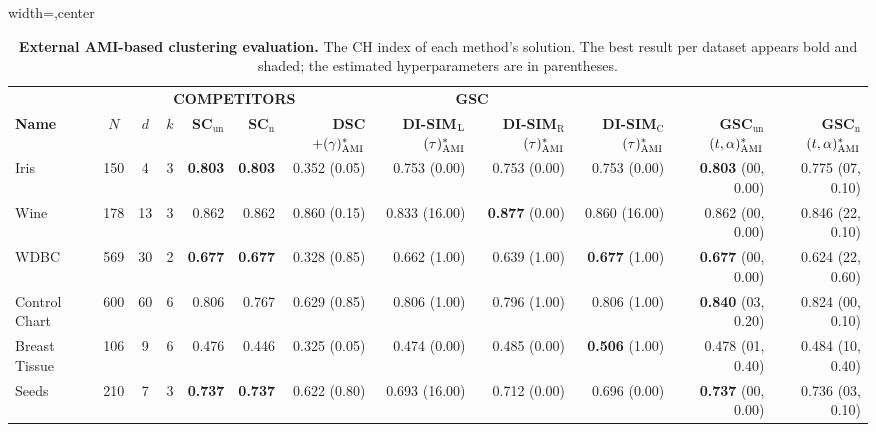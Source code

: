 \documentclass[10pt]{article} %
\newcommand{\bestcell}[1]{\cellcolor{gray!30}\textbf{#1}}
\newcommand{\GSC}{GSC\xspace}
\newcommand{\bestpar}[2] {(#1)^*_{\textsc{#2}}}
\newcommand{\hyperp}[1]{\tiny{\tiny(#1)}}
\begin{document}
\begin{table}[t]
\scriptsize
\centering
%
\caption{\textbf{External AMI-based clustering evaluation.} The CH index of each method's solution. The best result per dataset appears bold and shaded; the estimated hyperparameters are in parentheses.}
\vskip -5pt
\label{tab:ami_clustering_scores}
\begin{adjustbox}{width=\linewidth,center}
\begin{tabular}{lccc|rrrrrr|rr}
\Xhline{1pt}
\multicolumn{4}{c|}{\fontsize{6pt}{6pt}\textbf{DATASETS}} & \multicolumn{6}{c|}{\fontsize{6pt}{6pt}\textbf{COMPETITORS}} & \multicolumn{2}{c}{\fontsize{6pt}{6pt}\textbf{\GSC}}\\[0.25em]
\textbf{Name} & $N$ & $d$ & $k$
& \textbf{SC$_{\text{un}}$} & \textbf{SC$_{\text{n}}$} & \textbf{DSC}$+\bestpar{\gamma}{AMI}$
& \textbf{DI-SIM$_{\textup{L}}$}$\bestpar{\tau}{AMI}$ & \textbf{DI-SIM$_{\text{R}}$}$\bestpar{\tau}{AMI}$ & \textbf{DI-SIM$_{\text{C}}$}$\bestpar{\tau}{AMI}$
& \textbf{GSC$_{\text{un}}$}$\bestpar{t,\alpha}{AMI}$ & \textbf{GSC$_{\text{n}}$}$\bestpar{t,\alpha}{AMI}$ \\[0.25em]
\hline
Iris & 150 & 4 & 3 & \bestcell{0.803} & \bestcell{0.803} & 0.352 \hyperp{0.05} & 0.753 \hyperp{0.00} & 0.753 \hyperp{0.00} & 0.753 \hyperp{0.00} & \bestcell{0.803} \hyperp{00, 0.00} & 0.775 \hyperp{07, 0.10} \\
Wine & 178 & 13 & 3 & 0.862 & 0.862 & 0.860 \hyperp{0.15} & 0.833 \hyperp{16.00} & \bestcell{0.877} \hyperp{0.00} & 0.860 \hyperp{16.00} & 0.862 \hyperp{00, 0.00} & 0.846 \hyperp{22, 0.10} \\
WDBC & 569 & 30 & 2 & \bestcell{0.677} & \bestcell{0.677} & 0.328 \hyperp{0.85} & 0.662 \hyperp{1.00} & 0.639 \hyperp{1.00} & \bestcell{0.677} \hyperp{1.00} & \bestcell{0.677} \hyperp{00, 0.00} & 0.624 \hyperp{22, 0.60} \\
Control Chart & 600 & 60 & 6 & 0.806 & 0.767 & 0.629 \hyperp{0.85} & 0.806 \hyperp{1.00} & 0.796 \hyperp{1.00} & 0.806 \hyperp{1.00} & \bestcell{0.840} \hyperp{03, 0.20} & 0.824 \hyperp{00, 0.10} \\
Breast Tissue & 106 & 9 & 6 & 0.476 & 0.446 & 0.325 \hyperp{0.05} & 0.474 \hyperp{0.00} & 0.485 \hyperp{0.00} & \bestcell{0.506} \hyperp{1.00} & 0.478 \hyperp{01, 0.40} & 0.484 \hyperp{10, 0.40} \\
Seeds & 210 & 7 & 3 & \bestcell{0.737} & \bestcell{0.737} & 0.622 \hyperp{0.80} & 0.693 \hyperp{16.00} & 0.712 \hyperp{0.00} & 0.696 \hyperp{0.00} & \bestcell{0.737} \hyperp{00, 0.00} & 0.736 \hyperp{03, 0.10} \\

\end{tabular}
\end{adjustbox}
\end{table}
\end{document}
